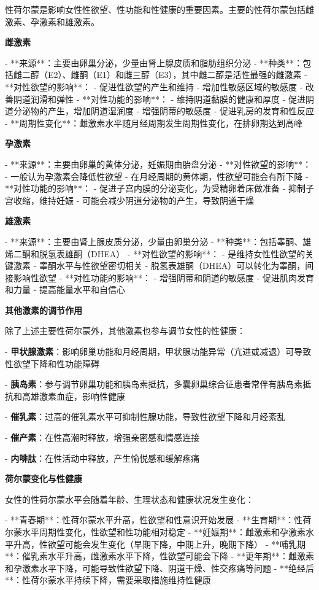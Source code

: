 \begin{enumerate}
性荷尔蒙是影响女性性欲望、性功能和性健康的重要因素。主要的性荷尔蒙包括雌激素、孕激素和雄激素。

\textbf{雌激素}

- **来源**：主要由卵巢分泌，少量由肾上腺皮质和脂肪组织分泌
- **种类**：包括雌二醇（E2）、雌酮（E1）和雌三醇（E3），其中雌二醇是活性最强的雌激素
- **对性欲望的影响**：
  - 促进性欲望的产生和维持
  - 增加性敏感区域的敏感度
  - 改善阴道润滑和弹性
- **对性功能的影响**：
  - 维持阴道黏膜的健康和厚度
  - 促进阴道分泌物的产生，增加阴道湿润度
  - 增强阴蒂的敏感度
  - 促进乳房的发育和性反应
- **周期性变化**：雌激素水平随月经周期发生周期性变化，在排卵期达到高峰

\textbf{孕激素}

- **来源**：主要由卵巢的黄体分泌，妊娠期由胎盘分泌
- **对性欲望的影响**：
  - 一般认为孕激素会降低性欲望
  - 在月经周期的黄体期，性欲望可能会有所下降
- **对性功能的影响**：
  - 促进子宫内膜的分泌变化，为受精卵着床做准备
  - 抑制子宫收缩，维持妊娠
  - 可能会减少阴道分泌物的产生，导致阴道干燥

\textbf{雄激素}

- **来源**：主要由肾上腺皮质分泌，少量由卵巢分泌
- **种类**：包括睾酮、雄烯二酮和脱氢表雄酮（DHEA）
- **对性欲望的影响**：
  - 是维持女性性欲望的关键激素
  - 睾酮水平与性欲望密切相关
  - 脱氢表雄酮（DHEA）可以转化为睾酮，间接影响性欲望
- **对性功能的影响**：
  - 增强阴蒂和阴道的敏感度
  - 促进肌肉发育和力量
  - 提高能量水平和自信心

\textbf{其他激素的调节作用}

除了上述主要性荷尔蒙外，其他激素也参与调节女性的性健康：

- \textbf{甲状腺激素}：影响卵巢功能和月经周期，甲状腺功能异常（亢进或减退）可导致性欲望下降和性功能障碍

- \textbf{胰岛素}：参与调节卵巢功能和胰岛素抵抗，多囊卵巢综合征患者常伴有胰岛素抵抗和高雄激素血症，影响性健康

- \textbf{催乳素}：过高的催乳素水平可抑制性腺功能，导致性欲望下降和月经紊乱

- \textbf{催产素}：在性高潮时释放，增强亲密感和情感连接

- \textbf{内啡肽}：在性活动中释放，产生愉悦感和缓解疼痛

\textbf{荷尔蒙变化与性健康}

女性的性荷尔蒙水平会随着年龄、生理状态和健康状况发生变化：

- **青春期**：性荷尔蒙水平升高，性欲望和性意识开始发展
- **生育期**：性荷尔蒙水平周期性变化，性欲望和性功能相对稳定
- **妊娠期**：雌激素和孕激素水平升高，性欲望可能会发生变化（早期下降，中期上升，晚期下降）
- **哺乳期**：催乳素水平升高，雌激素水平下降，性欲望可能会下降
- **更年期**：雌激素和孕激素水平下降，可能导致性欲望下降、阴道干燥、性交疼痛等问题
- **绝经后**：性荷尔蒙水平持续下降，需要采取措施维持性健康


\end{enumerate}
